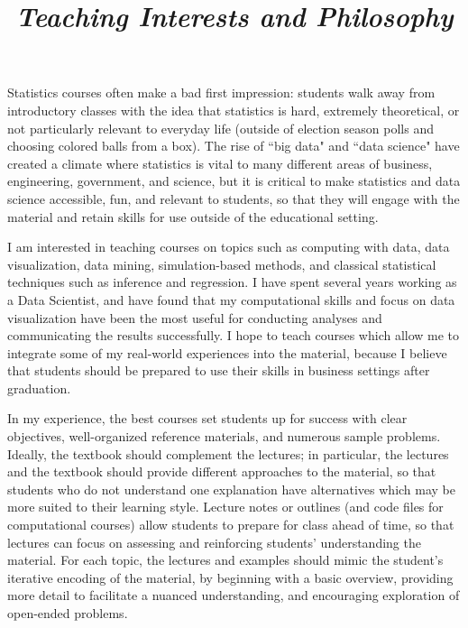 \documentclass[12pt, letterpaper, sans]{moderncv}
\title{\emph{Teaching Interests and Philosophy}}
\begin{document}
\makecvtitle
\setlength{\parindent}{15pt} %

Statistics courses often make a bad first impression: students walk away from introductory classes with the idea that statistics is hard, extremely theoretical, or not particularly relevant to everyday life (outside of election season polls and choosing colored balls from a box). The rise of ``big data" and ``data science" have created a climate where statistics is vital to many different areas of business, engineering, government, and science, but it is critical to make statistics and data science accessible, fun, and relevant to students, so that they will engage with the material and retain skills for use outside of the educational setting.

\vspace{.5cm}\hspace{8pt}
I am interested in teaching courses on topics such as computing with data, data visualization, data mining, simulation-based methods, and classical statistical techniques such as inference and regression. I have spent several years working as a Data Scientist, and have found that my computational skills and focus on data visualization have been the most useful for conducting analyses and communicating the results successfully. I hope to teach courses which allow me to integrate some of my real-world experiences into the material, because I believe that students should be prepared to use their skills in business settings after graduation.


\vspace{.5cm}\hspace{8pt}
In my experience, the best courses set students up for success with clear objectives, well-organized reference materials, and numerous sample problems. Ideally, the textbook should complement the lectures; in particular, the lectures and the textbook should provide different approaches to the material, so that students who do not understand one explanation have alternatives which may be more suited to their learning style. Lecture notes or outlines (and code files for computational courses) allow students to prepare for class ahead of time, so that lectures can focus on assessing and reinforcing students' understanding the material. For each topic, the lectures and examples should mimic the student's iterative encoding of the material, by beginning with a basic overview, providing more detail to facilitate a nuanced understanding, and encouraging exploration of open-ended problems.
\end{document}
